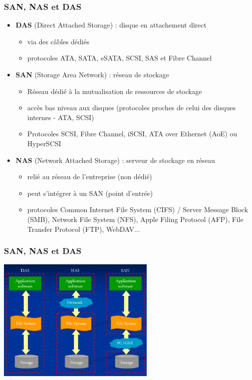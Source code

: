 \begin{frame}
  \frametitle{SAN, NAS et DAS}
  \begin{itemize}
    \item \textbf{DAS} (Direct Attached Storage) : disque en attachement direct
    \begin{itemize}
      \item via des câbles dédiés
      \item protocoles ATA, SATA, eSATA, SCSI, SAS et Fibre Channel
    \end{itemize}
    \item \textbf{SAN} (Storage Area Network) : réseau de stockage
    \begin{itemize}
      \item Réseau dédié à la mutualisation de ressources de stockage
      \item accès bas niveau aux disques (protocoles proches de celui des disques internes - ATA, SCSI)
      \item Protocoles SCSI, Fibre Channel, iSCSI, ATA over Ethernet (AoE) ou HyperSCSI
    \end{itemize}
    \item \textbf{NAS} (Network Attached Storage) : serveur de stockage en réseau
    \begin{itemize}
      \item relié au réseau de l'entreprise (non dédié)
      \item peut s'intégrer à un SAN (point d'entrée)
      \item protocoles Common Internet File System (CIFS) / Server Message Block (SMB), Network File System (NFS), Apple Filing Protocol (AFP), File Transfer Protocol (FTP), WebDAV...
    \end{itemize}
  \end{itemize}
\end{frame}

\begin{frame}
  \frametitle{SAN, NAS et DAS \cite{wp-san}}
  \begin{center}
    \includegraphics[height=6cm]{../illustration/DAS_NAS_SAN.png}
  \end{center}
\end{frame}



